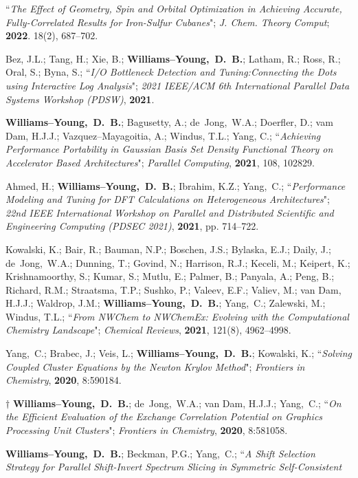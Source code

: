 \documentclass[10pt]{res} %
\newcommand*\me[0]{{\bf Williams--Young,~D.~B.}}
\newcommand*\cy[0]{Yang,~C.}
\newcommand*\bdj[0]{de~Jong,~W.A.}
\begin{document}
\begin{resume}
\begin{etaremune}
       ``\emph{The Effect of Geometry, Spin and Orbital Optimization in Achieving Accurate, Fully-Correlated Results for Iron-Sulfur 
                Cubanes}"; \emph{J. Chem. Theory Comput}; \textbf{2022}. 18(2), 687–702.
  \item Bez, J.L.; Tang, H.; Xie, B.; \me; Latham, R.; Ross, R.; Oral, S.; Byna, S.;
        ``\emph{I/O Bottleneck Detection and Tuning:Connecting the Dots using Interactive Log Analysis}";
        \emph{2021 IEEE/ACM 6th International Parallel Data Systems Workshop (PDSW)}, 
        \textbf{2021}.
  \item \me; Bagusetty, A.; \bdj; Doerfler, D.; vam Dam, H.J.J.; Vazquez--Mayagoitia, A.;
        Windus, T.L.; Yang, C.;
        ``\emph{Achieving Performance Portability in Gaussian Basis Set Density Functional Theory 
                on Accelerator Based Architectures}"; \emph{Parallel Computing},
        \textbf{2021}, 108, 102829.
  \item Ahmed, H.; \me; Ibrahim, K.Z.; \cy;
        ``\emph{Performance Modeling and Tuning for DFT Calculations on Heterogeneous Architectures}";
        \emph{22nd IEEE International Workshop on Parallel and Distributed Scientific and Engineering Computing (PDSEC 2021)},
        \textbf{2021}, pp. 714--722.
  \item Kowalski, K.; Bair, R.; Bauman, N.P.; Boschen, J.S.; Bylaska, E.J.; Daily, J.; \bdj; 
        Dunning, T.; Govind, N.; Harrison, R.J.; Keceli, M.; Keipert, K.; Krishnamoorthy, S.; Kumar, S.;
        Mutlu, E.; Palmer, B.; Panyala, A.; Peng, B.; Richard, R.M.; Straatsma, T.P.; Sushko, P.; Valeev, E.F.;
        Valiev, M.; van Dam, H.J.J.; Waldrop, J.M.; \me; \cy; Zalewski, M.; Windus, T.L.;
       ``\emph{From NWChem to NWChemEx: Evolving with the Computational Chemistry Landscape}"; \emph{Chemical Reviews},
       \textbf{2021}, 121(8), 4962--4998.
  \item \cy; Brabec, J.; Veis, L.; \me; Kowalski, K.;
        ``\emph{Solving Coupled Cluster Equations by the Newton Krylov Method}";
        \emph{Frontiers in Chemistry}, \textbf{2020}, 8:590184.
  \item $\dagger$ \me; \bdj; van Dam, H.J.J.; \cy;
        ``\emph{On the Efficient Evaluation of the Exchange Correlation Potential on Graphics Processing Unit Clusters}";
        \emph{Frontiers in Chemistry}, \textbf{2020}, 8:581058.
  \item \me; Beckman, P.G.; \cy;
        ``\emph{A Shift Selection Strategy for Parallel Shift-Invert Spectrum Slicing in Symmetric Self-Consistent 
}
\end{etaremune}
\end{resume}
\end{document}
